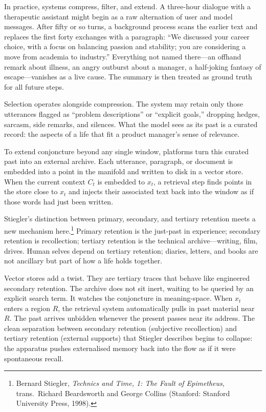 \documentclass[12pt,a4paper]{article}
\begin{document}
In practice, systems compress, filter, and extend. A three-hour dialogue with a therapeutic assistant might begin as a raw alternation of user and model messages. After fifty or so turns, a background process scans the earlier text and replaces the first forty exchanges with a paragraph: ``We discussed your career choice, with a focus on balancing passion and stability; you are considering a move from academia to industry.'' Everything not named there---an offhand remark about illness, an angry outburst about a manager, a half-joking fantasy of escape---vanishes as a live cause. The summary is then treated as ground truth for all future steps.

Selection operates alongside compression. The system may retain only those utterances flagged as ``problem descriptions'' or ``explicit goals,'' dropping hedges, sarcasm, side remarks, and silences. What the model sees as its past is a curated record: the aspects of a life that fit a product manager's sense of relevance.

To extend conjoncture beyond any single window, platforms turn this curated past into an external archive. Each utterance, paragraph, or document is embedded into a point in the manifold and written to disk in a vector store. When the current context $C_t$ is embedded to $x_t$, a retrieval step finds points in the store close to $x_t$ and injects their associated text back into the window as if those words had just been written.

Stiegler's distinction between primary, secondary, and tertiary retention meets a new mechanism here.\footnote{Bernard Stiegler, \emph{Technics and Time, 1: The Fault of Epimetheus}, trans.\ Richard Beardsworth and George Collins (Stanford: Stanford University Press, 1998).} Primary retention is the just-past in experience; secondary retention is recollection; tertiary retention is the technical archive---writing, film, drives. Human selves depend on tertiary retention; diaries, letters, and books are not ancillary but part of how a life holds together.

Vector stores add a twist. They are tertiary traces that behave like engineered secondary retention. The archive does not sit inert, waiting to be queried by an explicit search term. It watches the conjoncture in meaning-space. When $x_t$ enters a region $R$, the retrieval system automatically pulls in past material near $R$. The past arrives unbidden whenever the present passes near its address. The clean separation between secondary retention (subjective recollection) and tertiary retention (external supports) that Stiegler describes begins to collapse: the apparatus pushes externalised memory back into the flow as if it were spontaneous recall.
\end{document}
